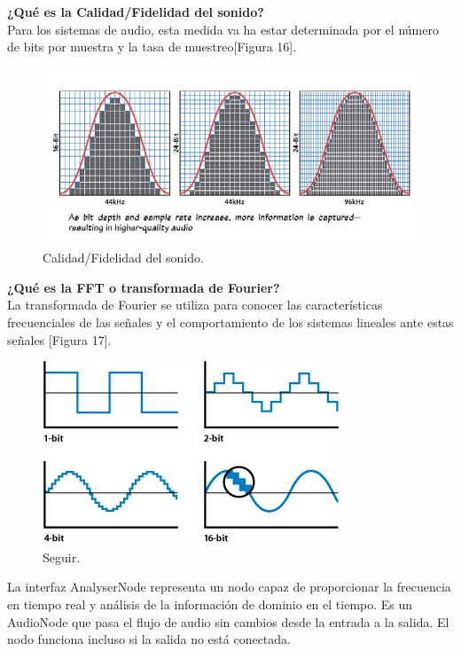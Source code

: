 \noindent\textbf{¿Qué es la Calidad/Fidelidad del sonido?}\\
Para los sistemas de audio, esta medida va ha estar determinada por el número de bits por muestra y la tasa de muestreo[Figura 16].\\

 \begin{figure}[h]
 \centering
 \includegraphics[scale=0.6]{../images/fidelidad_sonido.png}
 \caption{Calidad/Fidelidad del sonido.}
 \label{fig:../images/fidelidad_sonido.png}
 \end{figure}

\noindent\textbf{¿Qué es la FFT o transformada de Fourier?}\\
La transformada de Fourier se utiliza para conocer las características frecuenciales de las señales y el comportamiento de los sistemas lineales ante estas señales [Figura 17].\\

 \begin{figure}[h]
 \centering
 \includegraphics[scale=0.6]{../images/fouries.png}
 \caption{Seguir.}
 \label{fig:../images/fouries.png}
 \end{figure}

La interfaz AnalyserNode representa un nodo capaz de proporcionar la frecuencia en tiempo real y análisis de la información de dominio en el tiempo. Es un AudioNode que pasa el flujo de audio sin cambios desde la entrada a la salida. El nodo funciona incluso si la salida no está conectada.

